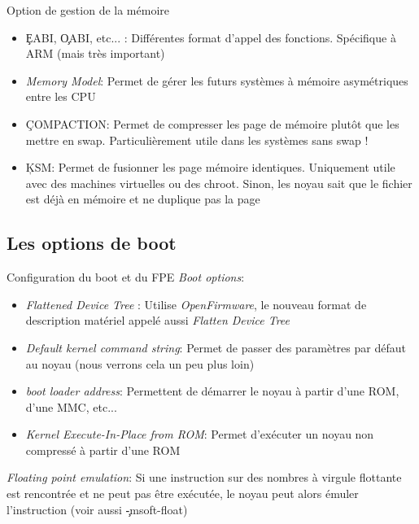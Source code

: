 \begin{frame}[fragile=singleslide]{Option de gestion de la mémoire}
  \begin{itemize} 
  \item \c{EABI},  \c{OABI}, etc...  : Différentes format  d'appel des
    fonctions. Spécifique à ARM (mais très important)
  \item  \emph{Memory Model}: Permet  de gérer  les futurs  systèmes à
    mémoire asymétriques entre les CPU
  \item  \c{COMPACTION}:  Permet de  compresser  les  page de  mémoire
    plutôt  que les mettre  en swap.  Particulièrement utile  dans les
    systèmes sans swap !
  \item  \c{KSM}: Permet  de  fusionner les  page mémoire  identiques.
    Uniquement   utile   avec   des   machines   virtuelles   ou   des
    chroot. Sinon, les  noyau sait que le fichier  est déjà en mémoire
    et ne duplique pas la page
  \end{itemize} 
\end{frame}

\subsection{Les options de boot}

\begin{frame}[fragile=singleslide]{Configuration du boot et du FPE}
  \emph{Boot options}:
  \begin{itemize}
  \item \emph{Flattened Device  Tree} : Utilise \emph{OpenFirmware}, le
    nouveau format de  description matériel appelé aussi \emph{Flatten
      Device Tree}
  \item  \emph{Default kernel  command string}:  Permet de  passer des
    paramètres  par défaut  au noyau  (nous verrons  cela un  peu plus
    loin)
  \item \emph{boot loader address}:  Permettent de démarrer le noyau à
    partir d'une ROM, d'une MMC, etc...
  \item \emph{Kernel Execute-In-Place  from ROM}: Permet d'exécuter un
    noyau non compressé à partir d'une ROM
  \end{itemize}
  \emph{Floating point emulation}: Si  une instruction sur des nombres
  à virgule flottante est rencontrée  et ne peut pas être exécutée, le
  noyau peut alors émuler l'instruction (voir aussi \c{-msoft-float})
\end{frame}

